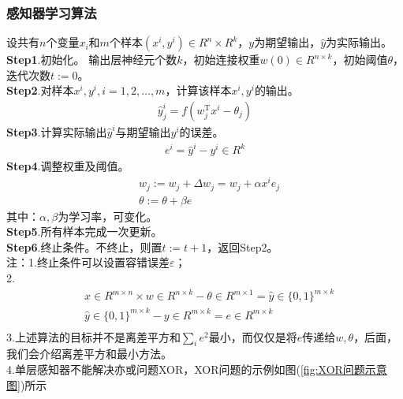             \subsubsection{感知器学习算法}
                \par
                设共有$n$个变量$x_i$和$m$个样本$(x^i,y^i)\in R^n\times R^k$，$y$为期望输出，$\hat{y}$为实际输出。\\
                \textbf{Step1}.初始化。
                输出层神经元个数$k$，初始连接权重$w(0)\in R^{n\times k}$，初始阈值$\theta$，迭代次数$t:=0$。\\
                \textbf{Step2}.对样本$x^i,y^i,i = 1,2,\dots,m$，计算该样本$x^i,y^i$的输出。
                \begin{align*}
                \hat{y}_j^i = f(w_j^\mathrm{T}x^i - \theta_j)
                \end{align*}
                \textbf{Step3}.计算实际输出$\hat{y}^i$与期望输出$y^i$的误差。
                \begin{align*}
                e^i = \hat{y}^i - y^i \in R^k
                \end{align*}
                \textbf{Step4}.调整权重及阈值。
                \begin{align*}
                & w_j:=w_j + \Delta w_j = w_j + \alpha x^i e_j \\
                & \theta:=\theta + \beta e
                \end{align*}
                其中：$\alpha,\beta$为学习率，可变化。\\
                \textbf{Step5}.所有样本完成一次更新。\\
                \textbf{Step6}.终止条件。不终止，则置$t:=t+1$，返回Step2。\\
                \textcolor[rgb]{1 0 0}{注：1.终止条件可以设置容错误差$\varepsilon$；}\\
                2.
                \begin{align*}
                &x\in R^{m\times n}\times w\in R^{n\times k} - \theta\in R^{m\times 1} = \hat{y}\in \{0,1\}^{m\times k}\\
                &\hat{y}\in \{0,1\}^{m\times k} - y\in R^{m\times k} = e\in R^{m\times k}\\
                \end{align*}
                3.上述算法的目标并不是离差平方和$\sum_ie^2$最小，而仅仅是将$e$传递给$w,\theta$，后面，我们会介绍离差平方和最小方法。\\
                4.单层感知器不能解决亦或问题XOR，XOR问题的示例如图(\ref{fig:XOR问题示意图})所示
